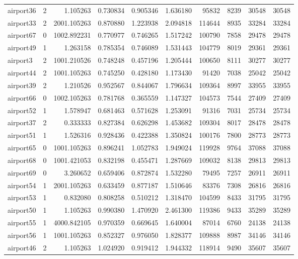 \begin{longtable}{|l|r|r|r|r|r|r|r|r|r|}
airport36 & 2 & 1.105263 & 0.730834 & 0.905346 & 1.636180 & 95832 & 8239 & 30548 & 30548 \\
airport33 & 2 & 2001.105263 & 0.870880 & 1.223938 & 2.094818 & 114644 & 8935 & 33284 & 33284 \\
airport67 & 0 & 1002.892231 & 0.770977 & 0.746265 & 1.517242 & 100790 & 7858 & 29478 & 29478 \\
airport49 & 1 & 1.263158 & 0.785354 & 0.746089 & 1.531443 & 104779 & 8019 & 29361 & 29361 \\
airport3 & 2 & 1001.210526 & 0.748248 & 0.457196 & 1.205444 & 100650 & 8111 & 30277 & 30277 \\
airport44 & 2 & 1001.105263 & 0.745250 & 0.428180 & 1.173430 & 91420 & 7038 & 25042 & 25042 \\
airport39 & 2 & 1.210526 & 0.952567 & 0.844067 & 1.796634 & 109364 & 8997 & 33955 & 33955 \\
airport66 & 0 & 1002.105263 & 0.781768 & 0.365559 & 1.147327 & 104573 & 7544 & 27409 & 27409 \\
airport52 & 1 & 1.578947 & 0.681463 & 0.571628 & 1.253091 & 91316 & 7031 & 25734 & 25734 \\
airport37 & 2 & 0.333333 & 0.827384 & 0.626298 & 1.453682 & 109304 & 8017 & 28478 & 28478 \\
airport51 & 1 & 1.526316 & 0.928436 & 0.422388 & 1.350824 & 100176 & 7800 & 28773 & 28773 \\
airport65 & 0 & 1001.105263 & 0.896241 & 1.052783 & 1.949024 & 119928 & 9764 & 37088 & 37088 \\
airport68 & 0 & 1001.421053 & 0.832198 & 0.455471 & 1.287669 & 109032 & 8138 & 29813 & 29813 \\
airport69 & 0 & 3.260652 & 0.659406 & 0.872874 & 1.532280 & 79495 & 7257 & 26911 & 26911 \\
airport54 & 1 & 2001.105263 & 0.633459 & 0.877187 & 1.510646 & 83376 & 7308 & 26816 & 26816 \\
airport53 & 1 & 0.832080 & 0.808258 & 0.510212 & 1.318470 & 104599 & 8433 & 31795 & 31795 \\
airport50 & 1 & 1.105263 & 0.990380 & 1.470920 & 2.461300 & 119386 & 9433 & 35289 & 35289 \\
airport55 & 1 & 4000.842105 & 0.970359 & 0.669645 & 1.640004 & 87014 & 6760 & 24138 & 24138 \\
airport56 & 1 & 1001.105263 & 0.852327 & 0.976050 & 1.828377 & 109888 & 8987 & 34146 & 34146 \\
airport46 & 2 & 1.105263 & 1.024920 & 0.919412 & 1.944332 & 118914 & 9490 & 35607 & 35607 \\

\end{longtable}
